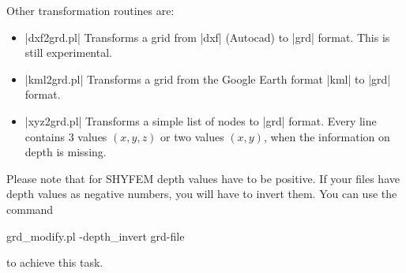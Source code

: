 Other transformation routines are:

\begin{itemize}

\item |dxf2grd.pl|  Transforms a grid from |dxf| (Autocad) to |grd|
format. This is still experimental.

\item |kml2grd.pl|  Transforms a grid from the Google Earth format |kml|
to |grd| format.

\item |xyz2grd.pl|  Transforms a simple list of nodes to |grd|
format. Every line contains 3 values $(x,y,z)$ or two values $(x,y)$,
when the information on depth is missing.

\end{itemize}

Please note that for SHYFEM depth values have to be positive. If your
files have depth values as negative numbers, you will have to invert
them. You can use the command

\begin{code}
    grd_modify.pl -depth_invert grd-file
\end{code}

to achieve this task.

